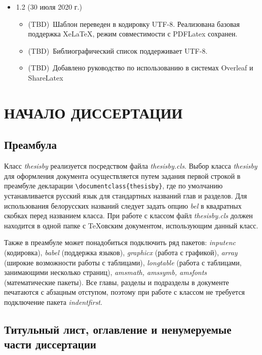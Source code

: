 \begin{itemize}
\item 1.2 (30 июля 2020 г.)
\begin{itemize}
	\item (TBD)~Шаблон переведен в кодировку UTF-8. Реализована базовая поддержка XeLaTeX, режим совместимости с PDFLatex сохранен.
	\item (TBD)~Библиографический список поддерживает UTF-8.
	\item (TBD)~Добавлено руководство по использованию в системах Overleaf и ShareLatex
\end{itemize}

\end{itemize}



\newpage
\chapter{НАЧАЛО ДИССЕРТАЦИИ}

\section{Преамбула}

Класс {\itshape thesisby} реализуется посредством файла {\itshape thesisby.cls}.
Выбор класса {\itshape thesisby} для оформления документа осуществляется путем 
задания первой строкой в преамбуле декларации \verb|\documentclass{thesisby}|,
где по умолчанию устанавливается русский язык для стандартных названий глав и
разделов. Для использования белорусских названий следует задать опцию {\itshape
bel} в квадратных скобках перед названием класса. При работе с классом файл {\itshape
thesisby.cls} должен находится в одной папке с \TeX овским документом,
использующим данный класс.

Также в преамбуле может понадобиться подключить ряд пакетов: {\itshape inputenc}
(кодировка), {\itshape babel} (поддержка языков), {\itshape graphicx} (работа с
графикой), {\itshape array} (широкие возможности работы с таблицами), {\itshape
longtable} (работа с таблицами, занимающими несколько страниц), {\itshape
amsmath, amssymb, amsfonts} (математические пакеты). Все главы, разделы и
подразделы в документе печатаются с абзацным отступом, поэтому при работе с
классом не требуется подключение пакета {\itshape indentfirst}.

\section{Титульный лист, оглавление и ненумеруемые части диссертации}

